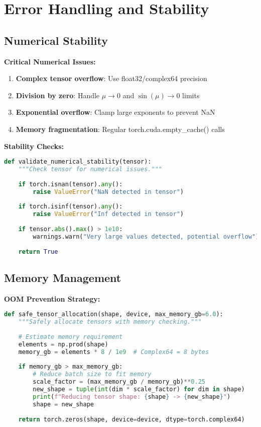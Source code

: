 \documentclass[11pt]{article}
\begin{document}
\section{Error Handling and Stability}

\subsection{Numerical Stability}

\textbf{Critical Numerical Issues:}
\begin{enumerate}
    \item \textbf{Complex tensor overflow}: Use float32/complex64 precision
    \item \textbf{Division by zero}: Handle $\mu \to 0$ and $\sin(\mu) \to 0$ limits
    \item \textbf{Exponential overflow}: Clamp large exponents to prevent NaN
    \item \textbf{Memory fragmentation}: Regular torch.cuda.empty_cache() calls
\end{enumerate}

\textbf{Stability Checks:}
\begin{lstlisting}[language=Python]
def validate_numerical_stability(tensor):
    """Check tensor for numerical issues."""
    
    if torch.isnan(tensor).any():
        raise ValueError("NaN detected in tensor")
    
    if torch.isinf(tensor).any():
        raise ValueError("Inf detected in tensor")
    
    if tensor.abs().max() > 1e10:
        warnings.warn("Very large values detected, potential overflow")
    
    return True
\end{lstlisting}

\subsection{Memory Management}

\textbf{OOM Prevention Strategy:}
\begin{lstlisting}[language=Python]
def safe_tensor_allocation(shape, device, max_memory_gb=6.0):
    """Safely allocate tensors with memory checking."""
    
    # Estimate memory requirement
    elements = np.prod(shape)
    memory_gb = elements * 8 / 1e9  # Complex64 = 8 bytes
    
    if memory_gb > max_memory_gb:
        # Reduce batch size to fit memory
        scale_factor = (max_memory_gb / memory_gb)**0.25
        new_shape = tuple(int(dim * scale_factor) for dim in shape)
        print(f"Reducing tensor shape: {shape} -> {new_shape}")
        shape = new_shape
    
    return torch.zeros(shape, device=device, dtype=torch.complex64)
\end{lstlisting}
\end{document}
